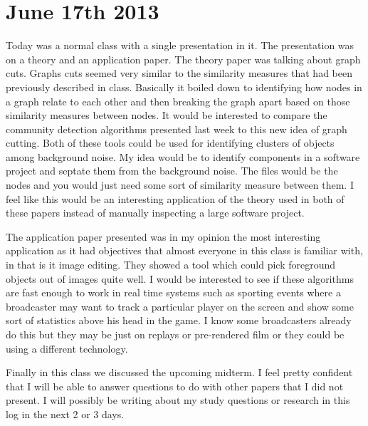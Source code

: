 \documentclass[conference]{IEEEtran}
\begin{document}
\section{June 17th 2013}
Today was a normal class with a single presentation in it. The presentation was on a theory and an 
application paper. The theory paper was talking about graph cuts. Graphs cuts seemed very similar to
the similarity measures that had been previously described in class. Basically it boiled down to
identifying how nodes in a graph relate to each other and then breaking the graph apart based on those
similarity measures between nodes. It would be interested to compare the community detection algorithms
presented last week to this new idea of graph cutting. Both of these tools could be used for identifying
clusters of objects among background noise. My idea would be to identify components in a software project
and septate them from the background noise. The files would be the nodes and you would just need some
sort of similarity measure between them. I feel like this would be an interesting application of the
theory used in both of these papers instead of manually inspecting a large software project.

The application paper presented was in my opinion the most interesting application as it had objectives
that almost everyone in this class is familiar with, in that is it image editing. They showed a tool which
could pick foreground objects out of images quite well. I would be interested to see if these algorithms
are fast enough to work in real time systems such as sporting events where a broadcaster may want to 
track a particular player on the screen and show some sort of statistics above his head
in the game. I know some broadcasters already do this but they may be just on replays or pre-rendered 
film or they could be using a different technology.

Finally in this class we discussed the upcoming midterm. I feel pretty confident that I will be able
to answer questions to do with other papers that I did not present. I will possibly be writing about
my study questions or research in this log in the next 2 or 3 days.


\balance



\end{document}
